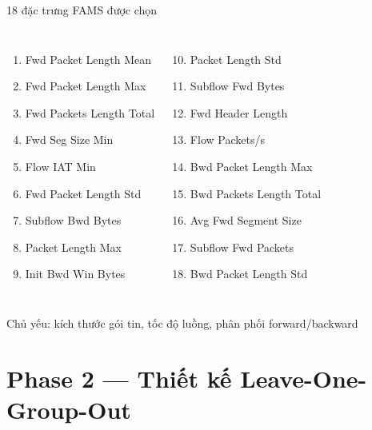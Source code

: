 \documentclass[aspectratio=169,12pt]{beamer}
\newcommand{\sidenote}[1]{\textcolor{mygray}{\small #1}}
\begin{document}
\begin{frame}{18 đặc trưng FAMS được chọn}
  \begin{columns}[T]
      \small
      \begin{enumerate}
        \item Fwd Packet Length Mean
        \item Fwd Packet Length Max
        \item Fwd Packets Length Total
        \item Fwd Seg Size Min
        \item Flow IAT Min
        \item Fwd Packet Length Std
        \item Subflow Bwd Bytes
        \item Packet Length Max
        \item Init Bwd Win Bytes
      \end{enumerate}
      \small
      \begin{enumerate}
        \setcounter{enumi}{9}
        \item Packet Length Std
        \item Subflow Fwd Bytes
        \item Fwd Header Length
        \item Flow Packets/s
        \item Bwd Packet Length Max
        \item Bwd Packets Length Total
        \item Avg Fwd Segment Size
        \item Subflow Fwd Packets
        \item Bwd Packet Length Std
      \end{enumerate}
  \end{columns}
  \vspace{0.4em}
  \begin{center}
    \sidenote{Chủ yếu: kích thước gói tin, tốc độ luồng, phân phối forward/backward}
  \end{center}
\end{frame}

\section{Phase 2 --- Thiết kế Leave-One-Group-Out}
\end{document}
